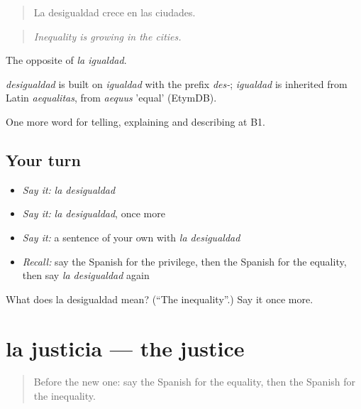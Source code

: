 \begin{quote}
La desigualdad crece en las ciudades.
\end{quote}

\begin{quote}
\emph{Inequality is growing in the cities.}
\end{quote}

The opposite of \emph{la igualdad}.

\begin{cousinweb}
\emph{desigualdad} is built on \emph{igualdad} with the prefix \emph{des-}; \emph{igualdad} is inherited from Latin \emph{aequalitas}, from \emph{aequus} 'equal' (EtymDB).
\end{cousinweb}

\begin{grammarlens}[title={What you've built}]
One more word for telling, explaining and describing at B1.
\end{grammarlens}

\subsection*{Your turn}
\begin{itemize}
\raggedright
  \item \emph{Say it:} \emph{la desigualdad}
  \item \emph{Say it:} \emph{la desigualdad}, once more
  \item \emph{Say it:} a sentence of your own with \emph{la desigualdad}
  \item \emph{Recall:} say the Spanish for the privilege, then the Spanish for the equality, then say \emph{la desigualdad} again
\end{itemize}

\begin{tcolorbox}[breakable,colback=teal!4,colframe=teal!35!black,title={Before you move on}]
What does la desigualdad mean? (\textquotedblleft{}The inequality\textquotedblright{}.) Say it once more.
\end{tcolorbox}
\section[la justicia]{la justicia — the justice}

\label{lesson:ES-C603-justicia}



\begin{quote}
Before the new one: say the Spanish for the equality, then the Spanish for the inequality.
\end{quote}

